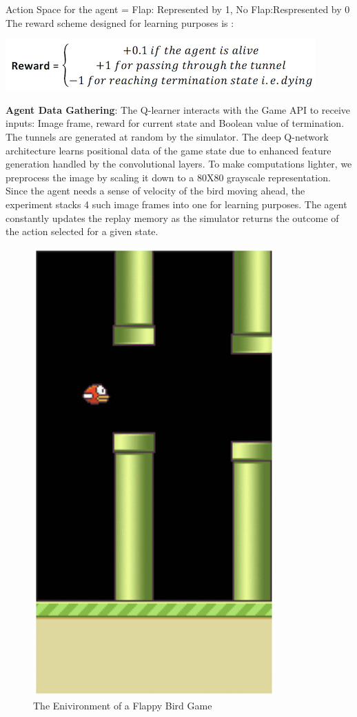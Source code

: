 \documentclass{article}
\begin{document}
Action Space for the agent = {Flap: Represented by 1, No Flap:Respresented by 0}
The reward scheme designed for learning purposes is :
\begin{center}
    \includegraphics{expt1}
\end{center}

\textbf{Agent Data Gathering}: The Q-learner interacts with the Game API to receive inputs: Image frame, reward for current state and Boolean value of termination. The tunnels are generated at random by the simulator. The deep Q-network architecture learns positional data of the game state due to enhanced feature generation handled by the convolutional layers. To make computations lighter, we preprocess the image by scaling it down to a 80X80 grayscale representation. Since the agent needs a sense of velocity of the bird moving ahead, the experiment stacks 4 such image frames into one for learning purposes. The agent constantly updates the replay memory as the simulator returns the outcome of the action selected for a given state.

\begin{figure}[H]
  \centering
      \includegraphics{method6}
  \caption{The Enivironment of a Flappy Bird Game}
\end{figure}
\end{document}
